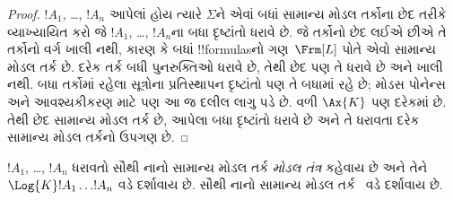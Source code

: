 \documentclass[../../../include/open-logic-section]{subfiles}
\begin{document}
\begin{proof}
  $!A_1$, \dots, $!A_n$ આપેલાં હોય ત્યારે $\Sigma$ને એવાં બધાં સામાન્ય
  મોડલ તર્કોના છેદ તરીકે વ્યાખ્યાયિત કરો જે $!A_1$, \dots, $!A_n$ના
  બધા દૃષ્ટાંતો ધરાવે છે. જે તર્કોનો છેદ લઈએ છીએ તે તર્કોનો
  વર્ગ ખાલી નથી, કારણ કે બધાં !!{formula}sનો ગણ~$\Frm[L]$
  પોતે એવો સામાન્ય મોડલ તર્ક છે. દરેક તર્ક બધી પુનરુક્તિઓ
  ધરાવે છે, તેથી છેદ પણ તે ધરાવે છે અને ખાલી નથી.
  બધા તર્કોમાં રહેલા સૂત્રોના પ્રતિસ્થાપન દૃષ્ટાંતો પણ
  તે બધામાં રહે છે; મોડસ પોનેન્સ અને આવશ્યકીકરણ માટે પણ
  આ જ દલીલ લાગુ પડે છે. વળી $\Ax{K}$
  પણ દરેકમાં છે.
  તેથી છેદ સામાન્ય મોડલ તર્ક છે, આપેલા બધા દૃષ્ટાંતો
  ધરાવે છે અને તે ધરાવતા દરેક સામાન્ય મોડલ તર્કનો ઉપગણ છે.
\end{proof}

\begin{defn}
$!A_1$, \dots, $!A_n$ ધરાવતો સૌથી નાનો સામાન્ય મોડલ તર્ક
\emph{મોડલ તંત્ર} કહેવાય છે અને તેને $\Log{K} !A_1 \dots
!A_n$ વડે દર્શાવાય છે. સૌથી નાનો સામાન્ય મોડલ તર્ક~ વડે
દર્શાવાય છે.
\end{defn}
\end{document}
